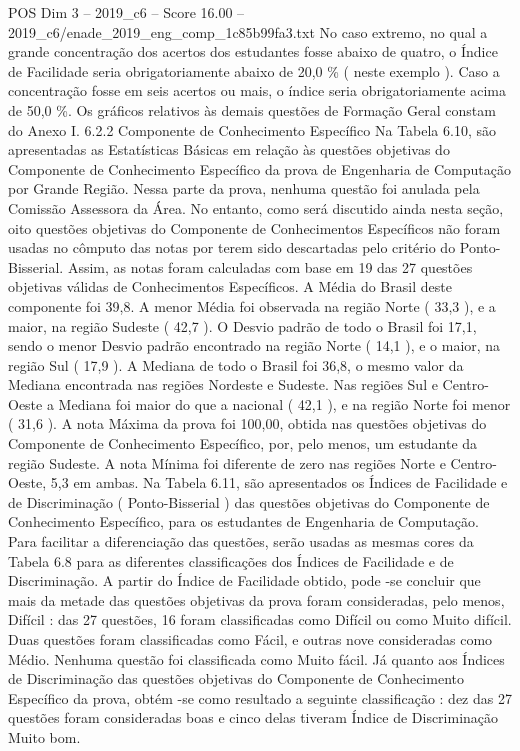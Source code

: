 \begin{textsample}{POS Dim 3 – 2019\_c6 – Score 16.00 – 2019\_c6/enade\_2019\_eng\_comp\_1c85b99fa3.txt}
No caso extremo, no qual a grande concentração dos acertos dos estudantes fosse abaixo de quatro, o Índice de Facilidade seria obrigatoriamente abaixo de 20,0 \% ( neste exemplo ).
Caso a concentração fosse em seis acertos ou mais, o índice seria obrigatoriamente acima de 50,0 \%.
Os gráficos relativos às demais questões de Formação Geral constam do Anexo I. 6.2.2 Componente de Conhecimento Específico Na Tabela 6.10, são apresentadas as Estatísticas Básicas em relação às questões objetivas do Componente de Conhecimento Específico da prova de Engenharia de Computação por Grande Região.
Nessa parte da prova, nenhuma questão foi anulada pela Comissão Assessora da Área.
No entanto, como será discutido ainda nesta seção, oito questões objetivas do Componente de Conhecimentos Específicos não foram usadas no cômputo das notas por terem sido descartadas pelo critério do Ponto-Bisserial.
Assim, as notas foram calculadas com base em 19 das 27 questões objetivas válidas de Conhecimentos Específicos.
A Média do Brasil deste componente foi 39,8.
A menor Média foi observada na região Norte ( 33,3 ), e a maior, na região Sudeste ( 42,7 ).
O Desvio padrão de todo o Brasil foi 17,1, sendo o menor Desvio padrão encontrado na região Norte ( 14,1 ), e o maior, na região Sul ( 17,9 ).
A Mediana de todo o Brasil foi 36,8, o mesmo valor da Mediana encontrada nas regiões Nordeste e Sudeste.
Nas regiões Sul e Centro-Oeste a Mediana foi maior do que a nacional ( 42,1 ), e na região Norte foi menor ( 31,6 ).
A nota Máxima da prova foi 100,00, obtida nas questões objetivas do Componente de Conhecimento Específico, por, pelo menos, um estudante da região Sudeste.
A nota Mínima foi diferente de zero nas regiões Norte e Centro-Oeste, 5,3 em ambas.
Na Tabela 6.11, são apresentados os Índices de Facilidade e de Discriminação ( Ponto-Bisserial ) das questões objetivas do Componente de Conhecimento Específico, para os estudantes de Engenharia de Computação.
Para facilitar a diferenciação das questões, serão usadas as mesmas cores da Tabela 6.8 para as diferentes classificações dos Índices de Facilidade e de Discriminação.
A partir do Índice de Facilidade obtido, pode -se concluir que mais da metade das questões objetivas da prova foram consideradas, pelo menos, Difícil : das 27 questões, 16 foram classificadas como Difícil ou como Muito difícil.
Duas questões foram classificadas como Fácil, e outras nove consideradas como Médio.
Nenhuma questão foi classificada como Muito fácil.
Já quanto aos Índices de Discriminação das questões objetivas do Componente de Conhecimento Específico da prova, obtém -se como resultado a seguinte classificação : dez das 27 questões foram consideradas boas e cinco delas tiveram Índice de Discriminação Muito bom.

\end{textsample}
